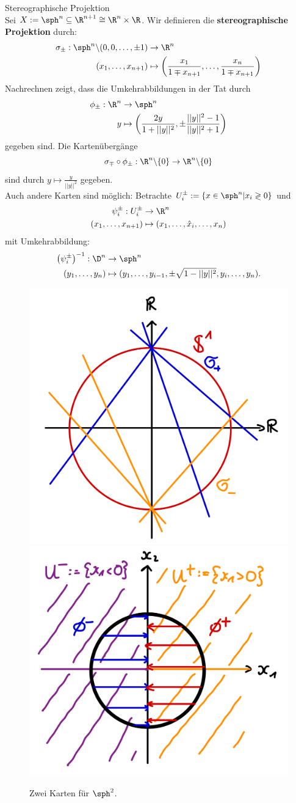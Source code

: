 \begin{beispiel}{Stereographische Projektion} \\
Sei $X := \sph^n \sub \R^{n+1} \cong \R^n \times \R$. Wir definieren die \textbf{stereographische Projektion} durch:
\begin{align}
\sigma_\pm : \sph^n \exc (0, 0, \dots, \pm 1) & \to \R^n \\
(x_1, \dots, x_{n+1}) & \mapsto \left( \frac{x_1}{1 \mp x_{n+1}}, \dots , \frac{x_n}{1 \mp x_{n+1}} \right)
\end{align} 
Nachrechnen zeigt, dass die Umkehrabbildungen in der Tat durch
\begin{align}
\phi_\pm : \R^n &\to \sph^n \\
y &\mapsto \left( \frac{2y}{1+||y||^2}, \pm \frac{||y||^2 - 1}{||y||^2 + 1}\right)
\end{align}
gegeben sind. Die Kartenübergänge
\begin{equation}
\sigma_\mp \circ \phi_\pm: \R^n \exc \{0\} \to \R^n \exc \{0\} 
\end{equation}
sind durch $y \mapsto \frac{y}{||y||^2}$ gegeben.\\
Auch andere Karten sind möglich:
Betrachte $U_i^\pm := \{ x \in \sph^n | x_i \gtrless 0 \}$ und 
\begin{align}
\psi_i^\pm: U_i^\pm &\to \R^n \\
(x_1, \dots, x_{n+1}) &\mapsto (x_1, \dots, \hat{x}_i, \dots, x_n)
\end{align}
mit Umkehrabbildung:
\begin{align}
\left( \psi_i^\pm \right)^{-1}: \D^n &\to \sph^n \\
(y_1, \dots, y_{n}) &\mapsto (y_1, \dots, y_{i-1}, \pm \sqrt{1-||y||^2}, y_i, \dots, y_n).
\end{align}
\begin{figure}[H]
\label{fig:sphere}
\centering
\includegraphics[width=0.2\linewidth]{Bilder/stereograph.png}
\includegraphics[width=0.2\linewidth]{Bilder/sphereproj.png}
\caption{Zwei Karten für $\sph^2$.}
\end{figure}
\end{beispiel}
